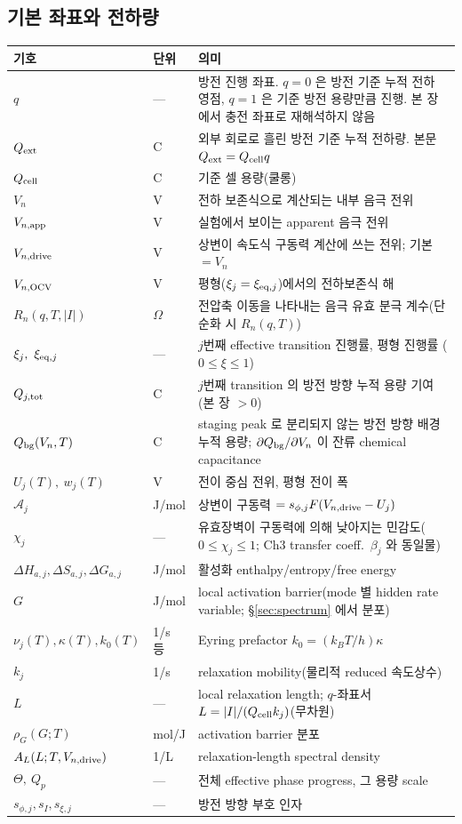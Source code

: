 \subsection{기본 좌표와 전하량}
\begin{longtable}{p{} p{} p{}}
\toprule 기호 & 단위 & 의미 \\ \midrule \endhead
$q$ & --- & 방전 진행 좌표. $q=0$ 은 방전 기준 누적 전하 영점, $q=1$ 은 기준 방전 용량만큼 진행. 본 장에서 충전 좌표로 재해석하지 않음 \\
$Q_{\mathrm{ext}}$ & C & 외부 회로로 흘린 방전 기준 누적 전하량. 본문 $Q_{\mathrm{ext}}=Q_{\mathrm{cell}} q$ \\
$Q_{\mathrm{cell}}$ & C & 기준 셀 용량(쿨롱) \\
$V_n$ & V & 전하 보존식으로 계산되는 내부 음극 전위 \\
$V_{n,\mathrm{app}}$ & V & 실험에서 보이는 apparent 음극 전위 \\
$V_{n,\mathrm{drive}}$ & V & 상변이 속도식 구동력 계산에 쓰는 전위; 기본 $=V_n$ \\
$V_{n,\mathrm{OCV}}$ & V & 평형($\xi_j=\xi_{\mathrm{eq},j}$)에서의 전하보존식 해 \\
$R_n(q,T,|I|)$ & $\Omega$ & 전압축 이동을 나타내는 음극 유효 분극 계수(단순화 시 $R_n(q,T)$) \\
$\xi_j,\ \xi_{\eq,j}$ & --- & $j$번째 effective transition 진행률, 평형 진행률 ($0\!\le\!\xi\!\le\!1$) \\
$Q_{j,\mathrm{tot}}$ & C & $j$번째 transition 의 방전 방향 누적 용량 기여(본 장 $>0$) \\
$Q_{\mathrm{bg}}(V_n,T)$ & C & staging peak 로 분리되지 않는 방전 방향 배경 누적 용량; $\partial Q_{\mathrm{bg}}/\partial V_n$ 이 잔류 chemical capacitance \\
$U_j(T),\ w_j(T)$ & V & 전이 중심 전위, 평형 전이 폭 \\
$\mathcal A_j$ & J/mol & 상변이 구동력 $=s_{\phi,j}F(V_{n,\mathrm{drive}}-U_j)$ \\
$\chi_j$ & --- & 유효장벽이 구동력에 의해 낮아지는 민감도($0\le\chi_j\le1$; Ch3 transfer coeff.\ $\beta_j$ 와 동일물) \\
$\Delta H_{a,j},\Delta S_{a,j},\Delta G_{a,j}$ & J/mol & 활성화 enthalpy/entropy/free energy \\
$G$ & J/mol & local activation barrier(mode 별 hidden rate variable; \S\ref{sec:spectrum} 에서 분포) \\
$\nu_j(T),\kappa(T),k_0(T)$ & 1/s 등 & Eyring prefactor $k_0=(k_BT/h)\kappa$ \\
$k_j$ & 1/s & relaxation mobility(물리적 reduced 속도상수) \\
$L$ & --- & local relaxation length; $q$-좌표서 $L=|I|/(Q_{\mathrm{cell}} k_j)$(무차원) \\
$\rho_G(G;T)$ & mol/J & activation barrier 분포 \\
$A_L(L;T,V_{n,\mathrm{drive}})$ & 1/L & relaxation-length spectral density \\
$\Theta,\ Q_p$ & --- & 전체 effective phase progress, 그 용량 scale \\
$s_{\phi,j},s_I,s_{\xi,j}$ & --- & 방전 방향 부호 인자 \\
\bottomrule
\end{longtable}

